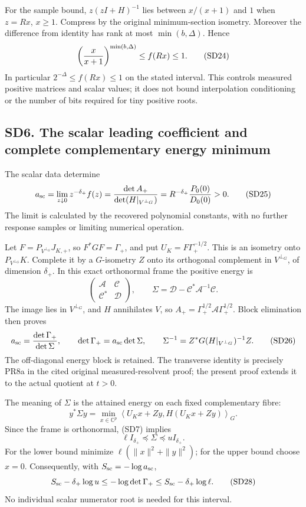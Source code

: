 \documentclass[11pt]{article}
\begin{document}
For the sample bound, \(z(zI+H)^{-1}\) lies between \(x/(x+1)\) and \(1\) when \(z=Rx\), \(x\ge1\). Compress by the original minimum-section isometry. Moreover the difference from identity has rank at most \(\min(b,\Delta)\). Hence \[
\left({x\over x+1}\right)^{\min(b,\Delta)}
\le f(Rx)\le1.
\tag{SD24}
\] In particular \(2^{-\Delta}\le f(Rx)\le1\) on the stated interval. This controls measured positive matrices and scalar values; it does not bound interpolation conditioning or the number of bits required for tiny positive roots.

\subsection{SD6. The scalar leading coefficient and complete complementary energy minimum}\label{sd6.-the-scalar-leading-coefficient-and-complete-complementary-energy-minimum}

The scalar data determine \[
a_{\rm sc}=\lim_{z\downarrow0}z^{-\delta_+}f(z)
=\frac{\det A_+}{\det(H|_{V^{\perp_G}})}
=R^{-\delta_+}\frac{P_0(0)}{D_0(0)}>0.
\tag{SD25}
\] The limit is calculated by the recovered polynomial constants, with no further response samples or limiting numerical operation.

Let \(F=P_{V^{\perp_G}}J_{K,+}\), so \(F^*GF=\Gamma_+\), and put \(U_K=F\Gamma_+^{-1/2}\). This is an isometry onto \(P_{V^{\perp_G}}K\). Complete it by a \(G\)-isometry \(Z\) onto its orthogonal complement in \(V^{\perp_G}\), of dimension \(\delta_+\). In this exact orthonormal frame the positive energy is \[
\begin{pmatrix}\mathcal A&\mathcal C\\
\mathcal C^*&\mathcal D\end{pmatrix},\qquad
\Sigma=\mathcal D-\mathcal C^*\mathcal A^{-1}\mathcal C.
\] The image lies in \(V^{\perp_G}\), and \(H\) annihilates \(V\), so \(A_+=\Gamma_+^{1/2}\mathcal A\Gamma_+^{1/2}\). Block elimination then proves \[
a_{\rm sc}=\frac{\det\Gamma_+}{\det\Sigma},
\qquad
\det\Gamma_+=a_{\rm sc}\det\Sigma,
\qquad
\Sigma^{-1}=Z^*G(H|_{V^{\perp_G}})^{-1}Z.
\tag{SD26}
\] The off-diagonal energy block is retained. The transverse identity is precisely PR8a in the cited original measured-resolvent proof; the present proof extends it to the actual quotient at \(t>0\).

The meaning of \(\Sigma\) is the attained energy on each fixed complementary fibre: \[
y^*\Sigma y=\min_{x\in\mathbb C^p}
\left\langle U_Kx+Zy,H(U_Kx+Zy)\right\rangle_G.
\] Since the frame is orthonormal, (SD7) implies \[
\ell I_{\delta_+}\preceq\Sigma\preceq uI_{\delta_+}.
\tag{SD27}
\] For the lower bound minimize \(\ell(\|x\|^2+\|y\|^2)\); for the upper bound choose \(x=0\). Consequently, with \(S_{\rm sc}=-\log a_{\rm sc}\), \[
S_{\rm sc}-\delta_+\log u
\le-\log\det\Gamma_+
\le S_{\rm sc}-\delta_+\log\ell.
\tag{SD28}
\] No individual scalar numerator root is needed for this interval.
\end{document}
